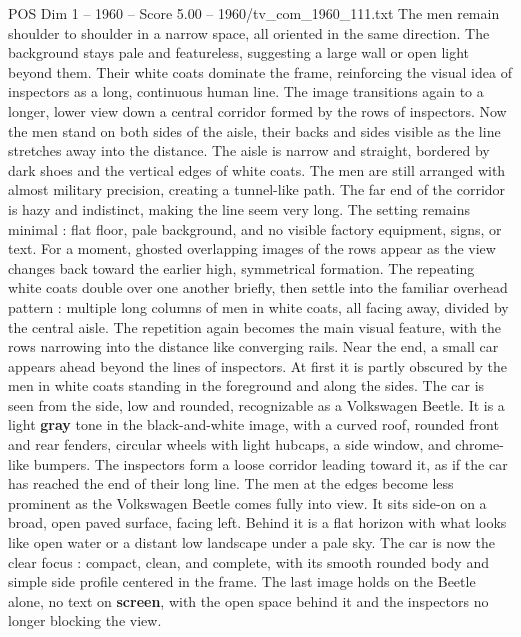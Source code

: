 \begin{textsample}{POS Dim 1 – 1960 – Score 5.00 – 1960/tv\_com\_1960\_111.txt}
The men remain shoulder to shoulder in a narrow space, all oriented in the same direction.
The background stays pale and featureless, suggesting a large wall or open light beyond them.
Their white coats dominate the frame, reinforcing the visual idea of inspectors as a long, continuous human line.
The image transitions again to a longer, lower view down a central corridor formed by the rows of inspectors.
Now the men stand on both sides of the aisle, their backs and sides visible as the line stretches away into the distance.
The aisle is narrow and straight, bordered by dark shoes and the vertical edges of white coats.
The men are still arranged with almost military precision, creating a tunnel-like path.
The far end of the corridor is hazy and indistinct, making the line seem very long.
The setting remains minimal : flat floor, pale background, and no visible factory equipment, signs, or text.
For a moment, ghosted overlapping images of the rows appear as the view changes back toward the earlier high, symmetrical formation.
The repeating white coats double over one another briefly, then settle into the familiar overhead pattern : multiple long columns of men in white coats, all facing away, divided by the central aisle.
The repetition again becomes the main visual feature, with the rows narrowing into the distance like converging rails.
Near the end, a small car appears ahead beyond the lines of inspectors.
At first it is partly obscured by the men in white coats standing in the foreground and along the sides.
The car is seen from the side, low and rounded, recognizable as a Volkswagen Beetle.
It is a light \textbf{gray} tone in the black-and-white image, with a curved roof, rounded front and rear fenders, circular wheels with light hubcaps, a side window, and chrome-like bumpers.
The inspectors form a loose corridor leading toward it, as if the car has reached the end of their long line.
The men at the edges become less prominent as the Volkswagen Beetle comes fully into view.
It sits side-on on a broad, open paved surface, facing left.
Behind it is a flat horizon with what looks like open water or a distant low landscape under a pale sky.
The car is now the clear focus : compact, clean, and complete, with its smooth rounded body and simple side profile centered in the frame.
The last image holds on the Beetle alone, no text on \textbf{screen}, with the open space behind it and the inspectors no longer blocking the view.

\end{textsample}
